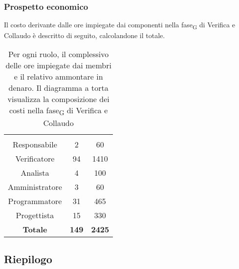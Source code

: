 \subsubsection{Prospetto economico}
Il costo derivante dalle ore impiegate dai componenti nella \gls{fase}\textsubscript{G} di Verifica e Collaudo è descritto di seguito, calcolandone il totale.

\begin{table}[H]
	{\setlength{\parindent}{0cm}
		\begin{minipage}{.43\textwidth}
			\begin{tabular}{ccc}
				\rowcolorhead
				\headertitle{Ruolo} & \headertitle{Ore} & \headertitle{Costo(\euro{})}\\
				Responsabile & 2 & 60\\
				Verificatore & 94 & 1410\\
				Analista & 4 & 100\\
				Amministratore & 3 & 60\\
				Programmatore & 31 & 465\\
				Progettista & 15 & 330\\
				\hline
				\textbf{Totale} & \textbf{149} & \textbf{2425}\\
			\end{tabular}
		\end{minipage}%
		\begin{minipage}{.57\textwidth}
	\end{minipage} }
	\caption[Prospetto economico della \gls{fase}\textsubscript{G} di Verifica e Collaudo]{Per ogni ruolo, il complessivo delle ore impiegate dai membri e il relativo ammontare in denaro. Il diagramma a torta visualizza la composizione dei costi nella \gls{fase}\textsubscript{G} di Verifica e Collaudo}
\end{table}



\newpage



\subsection{Riepilogo}

